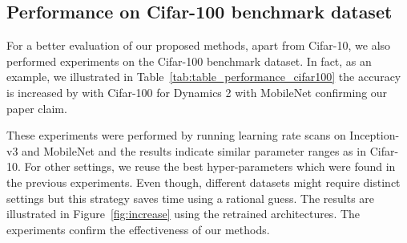\documentclass{ieeeaccess}
\begin{document}
\subsection{Performance on Cifar-100 benchmark dataset}
For a better evaluation of our proposed methods, apart from Cifar-10, we also performed experiments on the Cifar-100 benchmark dataset. In fact, as an example, we illustrated in Table~\ref{tab:table_performance_cifar100} the accuracy is increased by  with Cifar-100 for Dynamics 2 with MobileNet confirming our paper claim.

These experiments were performed by running learning rate scans on Inception-v3 and MobileNet and the results indicate similar parameter ranges as in Cifar-10. For other settings, we reuse the best hyper-parameters which were found in the previous experiments. Even though, different datasets might require distinct settings but this strategy saves time using a rational guess. The results are illustrated in Figure~\ref{fig:increase} using the retrained architectures. The experiments confirm the effectiveness of our methods.
\end{document}
